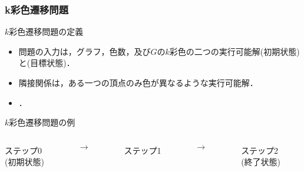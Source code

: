 \documentclass[dvipdfmx,11pt]{beamer}
\begin{document}

\begin{frame}\frametitle{k彩色遷移問題}

  \begin{block}{$k$彩色遷移問題の定義}
    \begin{itemize}
      \item 問題の入力は，グラフ，色数，及び$G$の$k$彩色の二つの実行可能解\structure{$\alpha$}(初期状態)と\structure{$\beta$}(目標状態)．
      \item 隣接関係は，ある一つの頂点のみ色が異なるような実行可能解．
      \item {}．
    \end{itemize}
  \end{block}

  \begin{exampleblock}{$k$彩色遷移問題の例}
    \begin{columns}
      \begin{column}{0.3\textwidth}
        \centering
        
        ステップ0\\(初期状態)
      \end{column}
      \begin{column}{0.05\textwidth}
        \textbf{$\longrightarrow$}
      \end{column}
      \begin{column}[]{0.3\textwidth}
        \centering
        
        ステップ1
      \end{column}
      \begin{column}{0.05\textwidth}
        \textbf{$\longrightarrow$}
      \end{column}
      \begin{column}{0.3\textwidth}
        \centering
        
        ステップ2\\(終了状態)
      \end{column}
    \end{columns}
  \end{exampleblock}
  
\end{frame}

\end{document}
